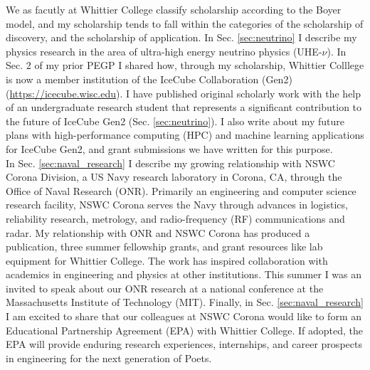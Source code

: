 \documentclass[../../main.tex]{subfiles}
\begin{document}
\label{sec:scholarship}

We as facutly at Whittier College classify scholarship according to the Boyer model, and my scholarship tends to fall within the categories of the scholarship of discovery, and the scholarship of application.  In Sec. \ref{sec:neutrino} I describe my physics research in the area of ultra-high energy neutrino physics (UHE-$\nu$).  In Sec. 2 of my prior PEGP I shared how, through my scholarship, Whittier Colllege is now a member institution of the IceCube Collaboration (Gen2) (\url{https://icecube.wisc.edu}).  I have published original scholarly work with the help of an undergraduate research student that represents a significant contribution to the future of IceCube Gen2 (Sec. \ref{sec:neutrino}).  I also write about my future plans with high-performance computing (HPC) and machine learning applications for IceCube Gen2, and grant submissions we have written for this purpose.
\\
\vspace{0.15cm}
In Sec. \ref{sec:naval_research} I describe my growing relationship with NSWC Corona Division, a US Navy research laboratory in Corona, CA, through the Office of Naval Research (ONR).  Primarily an engineering and computer science research facility, NSWC Corona serves the Navy through advances in logistics, reliability research, metrology, and radio-frequency (RF) communications and radar.  My relationship with ONR and NSWC Corona has produced a publication, three summer fellowship grants, and grant resources like lab equipment for Whittier College.  The work has inspired collaboration with academics in engineering and physics at other institutions.  This summer I was an invited to speak about our ONR research at a national conference at the Massachusetts Institute of Technology (MIT).  Finally, in Sec. \ref{sec:naval_research} I am excited to share that our colleagues at NSWC Corona would like to form an Educational Partnership Agreement (EPA) with Whittier College.  If adopted, the EPA will provide enduring research experiences, internships, and career prospects in engineering for the next generation of Poets.

\begin{flushleft}

\end{flushleft}

\begin{flushleft}

\end{flushleft}
\end{document}
